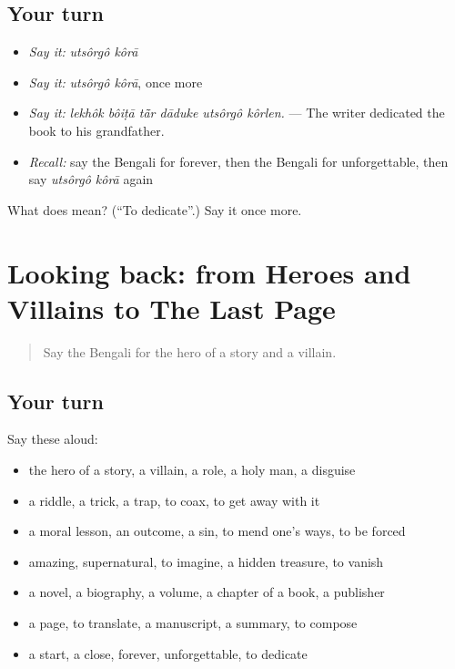 \subsection*{Your turn}
\begin{itemize}
\raggedright
  \item \emph{Say it:} \emph{utsôrgô kôrā}
  \item \emph{Say it:} \emph{utsôrgô kôrā}, once more
  \item \emph{Say it:} \emph{lekhôk bôiṭā tā̃r dāduke utsôrgô kôrlen.} — The writer dedicated the book to his grandfather.
  \item \emph{Recall:} say the Bengali for forever, then the Bengali for unforgettable, then say \emph{utsôrgô kôrā} again
\end{itemize}

\begin{tcolorbox}[breakable,colback=teal!4,colframe=teal!35!black,title={Before you move on}]
What does   mean? (\textquotedblleft{}To dedicate\textquotedblright{}.) Say it once more.
\end{tcolorbox}
\section[(dialogue)]{Looking back: from Heroes and Villains to The Last Page}

\label{lesson:BN-R329-review-323-329}



\begin{quote}
Say the Bengali for the hero of a story and a villain.
\end{quote}

\subsection*{Your turn}
Say these aloud:

\begin{itemize}
\raggedright
  \item the hero of a story, a villain, a role, a holy man, a disguise
  \item a riddle, a trick, a trap, to coax, to get away with it
  \item a moral lesson, an outcome, a sin, to mend one's ways, to be forced
  \item amazing, supernatural, to imagine, a hidden treasure, to vanish
  \item a novel, a biography, a volume, a chapter of a book, a publisher
  \item a page, to translate, a manuscript, a summary, to compose
  \item a start, a close, forever, unforgettable, to dedicate
\end{itemize}

